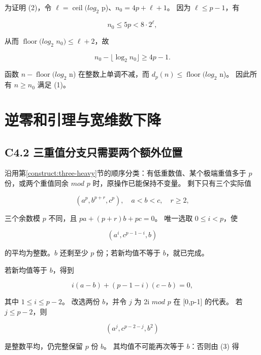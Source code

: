 \documentclass[11pt,a4paper]{article}
\theoremstyle{definition}
\numberwithin{equation}{section}
\begin{document}
{为证明} {(2)，令} {\ensuremath{\ell =\operatorname{ceil}(log_{2}}} {p)、\ensuremath{n_{0}=4p+\ell +1}。} {因为} {\ensuremath{\ell \le p-1}，有}

\[
n_0\le5p<8\cdot2^\ell,
\]

{从而} {\ensuremath{\operatorname{floor}(log_{2}}} {\ensuremath{n_{0})\le \ell +2}，故}

\[
n_0-\lfloor\log_2n_0\rfloor\ge4p-1.
\]

{函数} {\ensuremath{n-\operatorname{floor}(log_{2}}} {n)} {在整数上单调不减，而} {\ensuremath{d_{p}(n)\le \operatorname{floor}(log_{2}}} {n)。} {因此所有} {\ensuremath{n\ge n_{0}}} {满足} {(1)。}


\section{逆零和引理与宽维数下降}\label{construct:inverse-egz}
\subsection*{\texorpdfstring{{C4.2} {三重值分支只需要两个额外位置}}{C4.2 三重值分支只需要两个额外位置}}\label{C4-h20}

{沿用}第\ref{construct:three-heavy}节{的顺序分类：有低重数值、某个极端重值多于} {\ensuremath{p}} {份，或两个重值同余} {\ensuremath{mod}} {\ensuremath{p}} {时，原操作已能保持不变量。} {剩下只有三个实际值}

\[
(a^p,b^{p+r},c^p),\quad a<b<c,\quad r\ge2,
\]

{三个余数模} {\ensuremath{p}} {不同，且} {\ensuremath{pa+(p+r)b+pc=0}。} {唯一选取} {\ensuremath{0\le i<p}，使}

\[
(a^i,c^{p-1-i},b)
\]

{的平均为整数。\ensuremath{b}} {还剩至少} {\ensuremath{p}} {份；若新均值不等于} {\ensuremath{b}，就已完成。}

{若新均值等于} {\ensuremath{b}，得到}

\[
i(a-b)+(p-1-i)(c-b)=0,
\tag{C4.3}
\]

{其中} {\ensuremath{1\le i\le p-2}。} {改选两份} {\ensuremath{b}，并令} {\ensuremath{j}} {为} {2i} {\ensuremath{mod}} {\ensuremath{p}} {在} {{[}0,p-1{]}} {的代表。} {若} {\ensuremath{j\le p-2}，则}

\[
(a^j,c^{p-2-j},b^2)
\tag{C4.4}
\]

{是整数平均，仍完整保留} {\ensuremath{p}} {份} {\ensuremath{b}。} {其均值不可能再次等于} {\ensuremath{b}：否则由} {(3)} {得}
\end{document}
